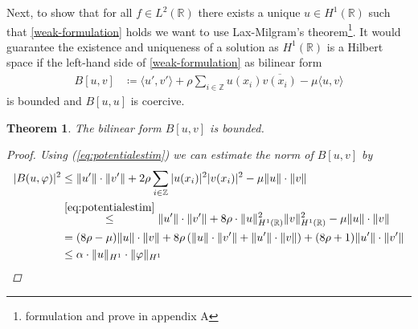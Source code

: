 \documentclass[fontsize=14pt,a4paper,DIV=1]{scrartcl}
\newtheorem{theorem}{Theorem}[section]
\numberwithin{equation}{section}
\newcommand{\R}{\mathbb{R}}
\newcommand{\Z}{\mathbb{Z}}
\begin{document}
Next, to show that for all $f \in L^{2}(\R)$ there exists a unique $u \in H^{1}(\R)$ such that \eqref{weak-formulation} holds we want to use Lax-Milgram's theorem\footnote{formulation and prove in appendix A}. It would guarantee the existence and uniqueness of a solution as $H^{1}(\R)$ is a Hilbert space if the left-hand side of \eqref{weak-formulation} as bilinear form
\begin{align*}
	B[u, v] & \coloneqq \langle u' , v' \rangle + \rho \sum_{i \in \Z} u(x_{i}) \overline{v(x_{i})} - \mu \langle u , v \rangle 
\end{align*}  
is bounded and $B[u,u]$ is coercive.
	
\begin{theorem} \label{1.1}
	The bilinear form $B[u, v]$ is bounded.
	\begin{proof}
		Using (\eqref{eq:potentialestim}) we can estimate the norm of $B[u, v]$ by
		\begin{align*}
			| B(u, \varphi)|^{2} & \leq \| u' \| \cdot \| v' \| + 2 \rho \sum_{i \in \Z} |u(x_{i})|^{2} |v(x_{i})|^{2} - \mu \| u \| \cdot \| v \| \\
				& \overset{\eqref{eq:potentialestim}}{\leq} \| u' \| \cdot \| v' \| + 8 \rho \cdot \| u \|^{2}_{H^{1}(\R)} \| v \|^{2}_{H^{1}(\R)}  - \mu \| u \| \cdot \| v \| \\
				& = (8\rho - \mu) \| u \| \cdot \| v \| + 8\rho \left( \| u \| \cdot \| v' \| + \| u' \| \cdot \| v \| \right) + (8\rho + 1) \| u' \| \cdot \| v'\| \\
				& \leq \alpha \cdot \| u \|_{H^{1}} \cdot \| \varphi \|_{H^{1}}
		\end{align*}
	\end{proof}
\end{theorem}
	
\end{document}
